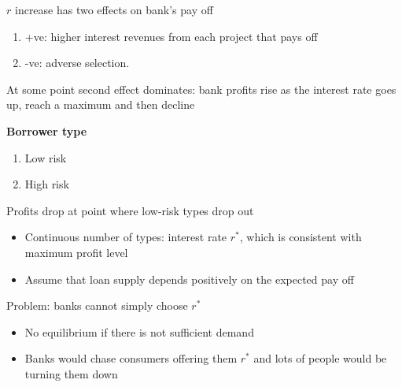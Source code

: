\documentclass{beamer}
\begin{document}
\begin{frame}
 $r$ increase has two effects on bank's pay off 
\begin{enumerate}
  \item +ve: higher interest revenues from each project that pays off
  \item -ve: adverse selection.   
\end{enumerate}
At some point second effect dominates: bank profits rise as the interest rate goes up, reach a maximum and then decline
\end{frame}

\begin{frame} 
 \textbf{Borrower type}
 \begin{enumerate}
   \item Low risk
   \item High risk
 \end{enumerate}
 Profits drop at point where low-risk types drop out
 \begin{itemize}
   \item Continuous number of types: interest rate $r^*$, which is consistent with maximum profit level
   \item Assume that loan supply depends positively on the expected pay off
 \end{itemize} 
\end{frame}

\begin{frame}
Problem: banks cannot simply choose $r^*$
 \begin{itemize}
   \item No equilibrium if there is not sufficient demand
   \item Banks would chase consumers offering them $r^*$ and lots of people would be turning them down
 \end{itemize}
\end{frame}
\end{document}
